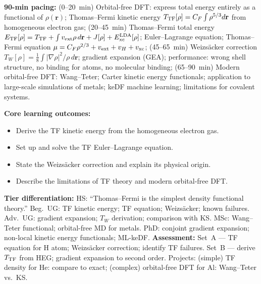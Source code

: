 \documentclass[11pt,a4paper]{article}
\begin{document}
\medskip

\begin{tcolorbox}[chembox, title={Module~III.3 / L02: Thomas--Fermi--Weizs\"acker Theory}]
\textbf{90-min pacing:} (0--20~min) Orbital-free DFT: express total energy entirely as a functional of $\rho(\mathbf{r})$; Thomas--Fermi kinetic energy $T_{\rm TF}[\rho]=C_F\int\rho^{5/3}d\mathbf{r}$ from homogeneous electron gas; (20--45~min) Thomas--Fermi total energy $E_{\rm TF}[\rho]=T_{\rm TF}+\int v_{\rm ext}\rho\,d\mathbf{r}+J[\rho]+E_{\rm xc}^{\rm LDA}[\rho]$; Euler--Lagrange equation; Thomas--Fermi equation $\mu=C_F\rho^{2/3}+v_{\rm ext}+v_H+v_{\rm xc}$; (45--65~min) Weizs\"acker correction $T_W[\rho]=\tfrac{1}{8}\int|\nabla\rho|^2/\rho\,d\mathbf{r}$; gradient expansion (GEA); performance: wrong shell structure, no binding for atoms, no molecular binding; (65--90~min) Modern orbital-free DFT: Wang--Teter; Carter kinetic energy functionals; application to large-scale simulations of metals; keDF machine learning; limitations for covalent systems.

\medskip\textbf{Core learning outcomes:}
\begin{itemize}[leftmargin=1.4em,topsep=2pt,itemsep=1pt]
  \item Derive the TF kinetic energy from the homogeneous electron gas.
  \item Set up and solve the TF Euler--Lagrange equation.
  \item State the Weizs\"acker correction and explain its physical origin.
  \item Describe the limitations of TF theory and modern orbital-free DFT.
\end{itemize}
\medskip\textbf{Tier differentiation:}
HS: ``Thomas--Fermi is the simplest density functional theory.''
Beg.\ UG: TF kinetic energy; TF equation; Weizs\"acker; known failures.
Adv.\ UG: gradient expansion; $T_W$ derivation; comparison with KS.
MSc: Wang--Teter functional; orbital-free MD for metals.
PhD: conjoint gradient expansion; non-local kinetic energy functionals; ML-keDF.
\medskip\textbf{Assessment:}
Set~A --- TF equation for H atom; Weizs\"acker correction; identify TF failures.
Set~B --- derive $T_{\rm TF}$ from HEG; gradient expansion to second order.
Projects: (simple) TF density for He: compare to exact; (complex) orbital-free DFT for Al: Wang--Teter vs.\ KS.
\end{tcolorbox}

\medskip
\end{document}
